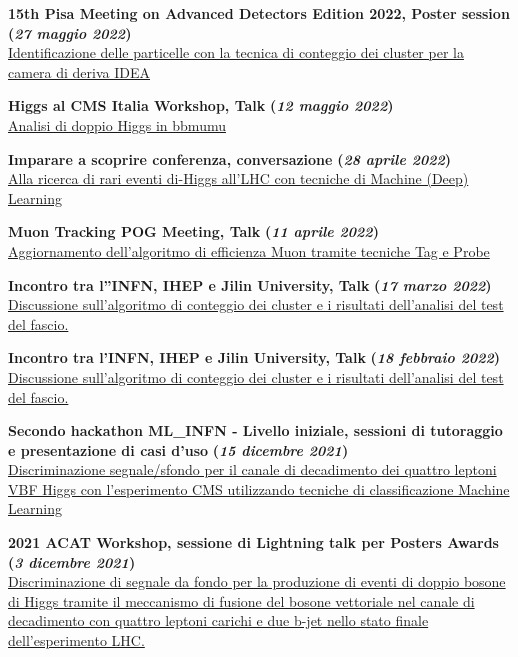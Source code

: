 \documentclass[11pt]{res}
\begin{document}
\begin{resume}
\textbf{15th Pisa Meeting on Advanced Detectors Edition 2022, Poster session} \textbf{(\textit{27 maggio 2022})}\\
\href{https://agenda.infn.it/event/22092/contributions/166630/}{Identificazione delle particelle con la tecnica di conteggio dei cluster per la camera di deriva IDEA}

\textbf{Higgs al CMS Italia Workshop, Talk} \textbf{(\textit{12 maggio 2022})}\\
\href{https://indico.cern.ch/event/1137095/}{Analisi di doppio Higgs in bbmumu}

\textbf{Imparare a scoprire conferenza, conversazione} \textbf{(\textit{28 aprile 2022})}\\
\href{https://indico.ijclab.in2p3.fr/event/5999/contributions/25075/}{Alla ricerca di rari eventi di-Higgs all'LHC con tecniche di Machine (Deep) Learning}

\textbf{Muon Tracking POG Meeting, Talk} \textbf{(\textit{11 aprile 2022})}\\
\href{https://indico.cern.ch/event/1148914/?note=193823}{Aggiornamento dell'algoritmo di efficienza Muon tramite tecniche Tag e Probe}

\textbf{Incontro tra l''INFN, IHEP e Jilin University, Talk} \textbf{(\textit{17 marzo 2022})} \\
\href{https://indico.ihep.ac.cn/event/15780/other-view?view=standard}{Discussione sull'algoritmo di conteggio dei cluster e i risultati dell'analisi del test del fascio.}

\textbf{Incontro tra l'INFN, IHEP e Jilin University, Talk} \textbf{(\textit{18 febbraio 2022})} \\
\href{https://indico.ihep.ac.cn/event/15780/other-view?view=standard}{Discussione sull'algoritmo di conteggio dei cluster e i risultati dell'analisi del test del fascio.}

\textbf{Secondo hackathon ML\_INFN - Livello iniziale, sessioni di tutoraggio e presentazione di casi d'uso} \textbf{(\textit{15 dicembre 2021})}\\
\href{https://agenda.infn.it/event/28565/contributions/148551/}{Discriminazione segnale/sfondo per il canale di decadimento dei quattro leptoni VBF Higgs con l'esperimento CMS utilizzando tecniche di classificazione Machine Learning}

\textbf{2021 ACAT Workshop, sessione di Lightning talk per Posters Awards} \textbf{(\textit{3 dicembre 2021})}\\
\href{https://indico.cern.ch/event/855454/contributions/4596351/}{Discriminazione di segnale da fondo per la produzione di eventi di doppio bosone di Higgs tramite il meccanismo di fusione del bosone vettoriale nel canale di decadimento con quattro leptoni carichi e due b-jet nello stato finale dell'esperimento LHC.}


\end{resume}
\end{document}
